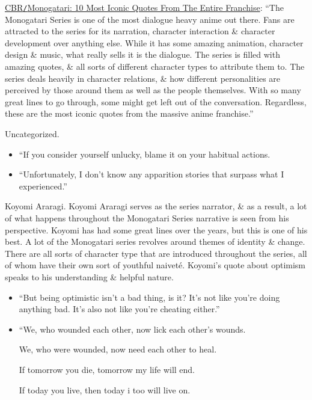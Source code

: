 \documentclass{article}
\begin{document}
\begin{enumerate}
    \href{https://www.cbr.com/monogatari-series-best-quotes/}{CBR{\tt/}Monogatari: 10 Most Iconic Quotes From The Entire Franchise}: ``The Monogatari Series is one of the most dialogue heavy anime out there. Fans are attracted to the series for its narration, character interaction \& character development over anything else. While it has some amazing animation, character design \& music, what really sells it is the dialogue. The series is filled with amazing quotes, \& all sorts of different character types to attribute them to. The series deals heavily in character relations, \& how different personalities are perceived by those around them as well as the people themselves. With so many great lines to go through, some might get left out of the conversation. Regardless, these are the most iconic quotes from the massive anime franchise.''

    {\sf Uncategorized.}
    \begin{itemize}
    	\item ``If you consider yourself unlucky, blame it on your habitual actions.\\
    	\item ``Unfortunately, I don't know any apparition stories that surpass what I experienced.''
    \end{itemize}

    {\sf Koyomi Araragi.} Koyomi Araragi serves as the series narrator, \& as a result, a lot of what happens throughout the Monogatari Series narrative is seen from his perspective. Koyomi has had some great lines over the years, but this is one of his best. A lot of the Monogatari series revolves around themes of identity \& change. There are all sorts of character type that are introduced throughout the series, all of whom have their own sort of youthful naiveté. Koyomi's quote about optimism speaks to his understanding \& helpful nature.
    \begin{itemize}
    	\item ``But being optimistic isn't a bad thing, is it? It's not like you're doing anything bad. It's also not like you're cheating either.''
    	\item ``We, who wounded each other, now lick each other's wounds.

    	We, who were wounded, now need each other to heal.

    	If tomorrow you die, tomorrow my life will end.

    	If today you live, then today i too will live on.


\end{itemize}
\end{enumerate}
\end{document}
